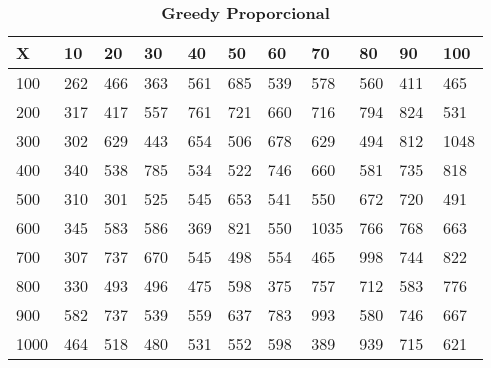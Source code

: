\documentclass[10pt,letterpaper]{article}
\begin{document}
\begin{center}
\begin{table}\renewcommand{\arraystretch}{2.5}
\caption{\large \textbf{Greedy Proporcional}}
\centering
\begin{tabular} { |m{0.5cm}|m{1.3cm}|m{1.3cm}|m{1.3cm}|m{1.3cm}|m{1.3cm}|m{1.3cm}|m{1.3cm}|m{1.3cm}|m{1.3cm}|m{1.3cm}|} 
\hline
\rowcolor{Gray}
\centering \textbf{X} & \centering \textbf{10} & \centering \textbf{20} & \centering \textbf{30}\ & \centering \textbf{40} & \centering \textbf{50} & \centering \textbf{60}\ & \centering \textbf{70} & \centering \textbf{80} & \centering \textbf{90}\ & \textbf{100} \\\hline
\cellcolor{Gray}100 & \Large 262 & \Large 466 & \Large 363 & \Large 561 & \Large 685 & \Large 539 & \Large 578 & \Large 560 & \Large 411 & \Large 465 \\
\hline
\cellcolor{Gray}200 & \Large 317 & \Large 417 & \Large 557 & \Large 761 & \Large 721 & \Large 660 & \Large 716 & \Large 794 & \Large 824 & \Large 531 \\
\hline
\cellcolor{Gray}300 & \Large 302 & \Large 629 & \Large 443 & \Large 654 & \Large 506 & \Large 678 & \Large 629 & \Large 494 & \Large 812 & \Large 1048 \\
\hline
\cellcolor{Gray}400 & \Large 340 & \Large 538 & \Large 785 & \Large 534 & \Large 522 & \Large 746 & \Large 660 & \Large 581 & \Large 735 & \Large 818 \\
\hline
\cellcolor{Gray}500 & \Large 310 & \Large 301 & \Large 525 & \Large 545 & \Large 653 & \Large 541 & \Large 550 & \Large 672 & \Large 720 & \Large 491 \\
\hline
\cellcolor{Gray}600 & \Large 345 & \Large 583 & \Large 586 & \Large 369 & \Large 821 & \Large 550 & \Large 1035 & \Large 766 & \Large 768 & \Large 663 \\
\hline
\cellcolor{Gray}700 & \Large 307 & \Large 737 & \Large 670 & \Large 545 & \Large 498 & \Large 554 & \Large 465 & \Large 998 & \Large 744 & \Large 822 \\
\hline
\cellcolor{Gray}800 & \Large 330 & \Large 493 & \Large 496 & \Large 475 & \Large 598 & \Large 375 & \Large 757 & \Large 712 & \Large 583 & \Large 776 \\
\hline
\cellcolor{Gray}900 & \Large 582 & \Large 737 & \Large 539 & \Large 559 & \Large 637 & \Large 783 & \Large 993 & \Large 580 & \Large 746 & \Large 667 \\
\hline
\cellcolor{Gray}1000 & \Large 464 & \Large 518 & \Large 480 & \Large 531 & \Large 552 & \Large 598 & \Large 389 & \Large 939 & \Large 715 & \Large 621 \\
\hline
\end{tabular} \\
\end{table}
\end{center}
\end{document}
